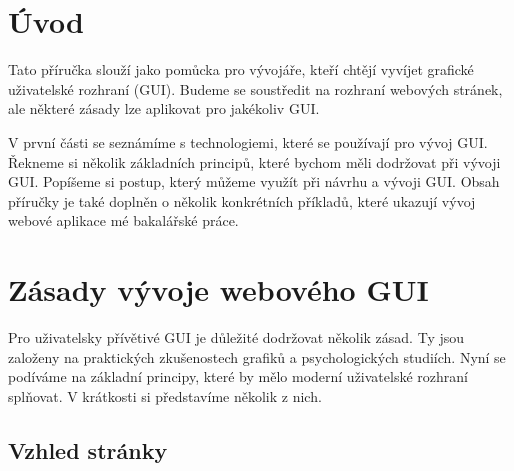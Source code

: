\section{Úvod}
\label{chap:introduction}

Tato příručka slouží jako pomůcka pro vývojáře, kteří chtějí vyvíjet grafické uživatelské rozhraní (GUI). Budeme se soustředit na rozhraní webových stránek, ale některé zásady lze aplikovat pro jakékoliv GUI.

V první části se seznámíme s technologiemi, které se používají pro vývoj GUI. Řekneme si několik základních principů, které bychom měli dodržovat při vývoji GUI. Popíšeme si postup, který můžeme využít při návrhu a vývoji GUI. Obsah příručky je také doplněn o několik konkrétních příkladů, které ukazují vývoj webové aplikace mé bakalářské práce.

\section{Zásady vývoje webového GUI}
\label{sec:principles}

Pro uživatelsky přívětivé GUI je důležité dodržovat několik zásad. Ty jsou založeny na praktických zkušenostech grafiků a psychologických studiích. Nyní se podíváme na základní principy, které by mělo moderní uživatelské rozhraní splňovat. V krátkosti si představíme několik z nich.

\subsection{Vzhled stránky}
\label{subsec:visual-principles}


